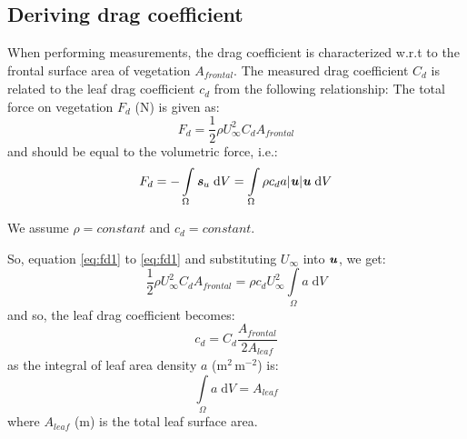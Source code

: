 
\subsection{Deriving drag coefficient}

When performing measurements, the drag coefficient is characterized w.r.t to the frontal surface area of vegetation $A_{\textit{frontal}}$. The measured drag coefficient $C_d$ is related to the leaf drag coefficient $c_d$ from the following relationship: 
The total force on vegetation $F_d$ (N) is given as:	 
\begin{equation}
F_d = \frac{1}{2}{\rho}U_\infty ^2{C_d}{A_{\textit{frontal}}}
\label{eq:fd1}
\end{equation}
and should be equal to the volumetric force, i.e.:
\begin{equation}
F_d = - \mathop \int\limits_\Omega \textbf{\textit{s}}_u\;\mathrm{d}V = \mathop \int \limits_\Omega  {\rho}{c_d}{a} |\textbf{\textit{u}}|\textbf{\textit{u}}\;\mathrm{d}V
\label{eq:fd2}
\end{equation}

\begin{assumption}
We assume $\rho = \textit{constant}$ and $c_d = \textit{constant}$.
\end{assumption}
So, equation \cref{eq:fd1} to \cref{eq:fd1} and substituting $U_\infty$ into $\textbf{\textit{u}}$, we get:
\begin{equation}
\frac{1}{2}{\rho}U_\infty ^2{C_d}{A_{\textit{frontal}}} = {\rho}{c_d} U_\infty ^2 \mathop \int \limits_\Omega {a}  \;\mathrm{d}V
\label{eq:fd3}
\end{equation}
and so, the leaf drag coefficient becomes:
\begin{equation}
c_d = C_d\frac{A_{\textit{frontal}}}{2A_{\textit{leaf}}}
\end{equation}
as the integral of leaf area density $a$ (m$^{2}$\,m$^{-2}$) is:
\begin{equation}
\mathop \int\limits_\Omega a\;\mathrm{d}V = A_{\textit{leaf}}
\end{equation}
where $A_{\textit{leaf}}$ (m) is the total leaf surface area.


